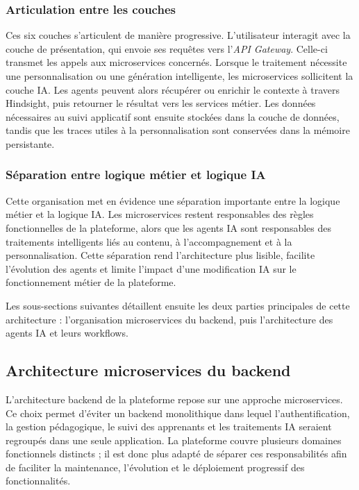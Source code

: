 \subsubsection{Articulation entre les couches}

Ces six couches s'articulent de manière progressive. L'utilisateur interagit avec la couche de présentation, qui envoie ses requêtes vers l'\textit{API Gateway}. Celle-ci transmet les appels aux microservices concernés. Lorsque le traitement nécessite une personnalisation ou une génération intelligente, les microservices sollicitent la couche IA. Les agents peuvent alors récupérer ou enrichir le contexte à travers Hindsight, puis retourner le résultat vers les services métier. Les données nécessaires au suivi applicatif sont ensuite stockées dans la couche de données, tandis que les traces utiles à la personnalisation sont conservées dans la mémoire persistante.

\subsubsection{Séparation entre logique métier et logique IA}

Cette organisation met en évidence une séparation importante entre la logique métier et la logique IA. Les microservices restent responsables des règles fonctionnelles de la plateforme, alors que les agents IA sont responsables des traitements intelligents liés au contenu, à l'accompagnement et à la personnalisation. Cette séparation rend l'architecture plus lisible, facilite l'évolution des agents et limite l'impact d'une modification IA sur le fonctionnement métier de la plateforme.

Les sous-sections suivantes détaillent ensuite les deux parties principales de cette architecture : l'organisation microservices du backend, puis l'architecture des agents IA et leurs workflows.

\subsection{Architecture microservices du backend}

L'architecture backend de la plateforme repose sur une approche microservices. Ce choix permet d'éviter un backend monolithique dans lequel l'authentification, la gestion pédagogique, le suivi des apprenants et les traitements IA seraient regroupés dans une seule application. La plateforme couvre plusieurs domaines fonctionnels distincts ; il est donc plus adapté de séparer ces responsabilités afin de faciliter la maintenance, l'évolution et le déploiement progressif des fonctionnalités.

